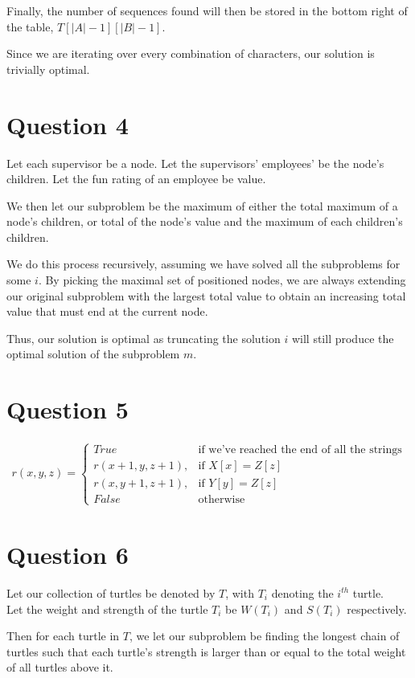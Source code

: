 \documentclass{article}
\begin{document}
Finally, the number of sequences found will then be stored in the bottom right of the table, $T[|A|-1][|B|-1]$.

Since we are iterating over every combination of characters, our solution is trivially optimal.

\section*{Question 4}
Let each supervisor be a node.
Let the supervisors' employees' be the node's children.
Let the fun rating of an employee be value.

We then let our subproblem be the maximum of either the total maximum of a node's children, or total of the node's value and the maximum of each children's children.

We do this process recursively, assuming we have solved all the subproblems for some $i$. By picking the maximal set of positioned nodes, we are always extending our original subproblem with the largest total value to obtain an increasing total value that must end at the current node.

Thus, our solution is optimal as truncating the solution $i$ will still produce the optimal solution of the subproblem $m$.

\section*{Question 5}
\begin{align*}
r(x, y, z) =
\begin{cases}
    True            & \text{if we've reached the end of all the strings}\\
    r(x+1, y, z+1), & \text{if } X[x] = Z[z]\\
    r(x, y+1, z+1), & \text{if } Y[y] = Z[z]\\
    False           & \text{otherwise}
\end{cases}
\end{align*}

\section*{Question 6}
Let our collection of turtles be denoted by $T$, with $T_i$ denoting the $i^{th}$ turtle.\\
Let the weight and strength of the turtle $T_i$ be $W(T_i)$ and $S(T_i)$ respectively.

Then for each turtle in $T$, we let our subproblem be finding the longest chain of turtles such that each turtle's strength is larger than or equal to the total weight of all turtles above it.
\end{document}
